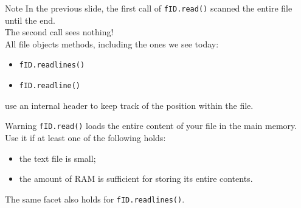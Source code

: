 \documentclass[t,handout,9pt]{beamer}
\begin{document}
\begin{frame}
\vfill
\begin{block}{Note}
In the previous slide, the first call of \texttt{fID.read()} scanned the entire file until the end.\\
The second call sees nothing!\\
All file objects methods, including the ones we see today:
\begin{itemize}
	\item \texttt{fID.readlines()}
	\item \texttt{fID.readline()}
\end{itemize}
use an internal header to keep track of the position within the file.
\end{block}
\vfill
\begin{block}{Warning}
\texttt{fID.read()} loads the entire content of your file in the main memory.\\
Use it if at least one of the following holds:
\begin{itemize}
	\item the text file is small;
	\item the amount of RAM is sufficient for storing its entire contents.
\end{itemize}
The same facet also holds for \texttt{fID.readlines()}.
\end{block}
\vfill
\end{frame}
%
\end{document}
